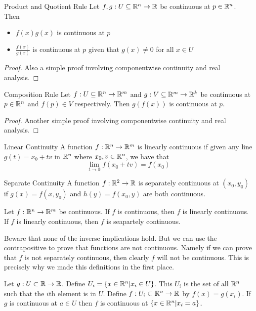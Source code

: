 \documentclass[a4paper]{article}
\begin{document}
\begin{prp}{Product and Quotient Rule}{} Let $f,g:U\subseteq\mathbb{R}^n\to\mathbb{R}$ be continuous at $p\in\mathbb{R}^n$. Then 
\begin{itemize}
\item $f(x)g(x)$ is continuous at $p$
\item $\frac{f(x)}{g(x)}$ is continuous at $p$ given that $g(x)\neq 0$ for all $x\in U$
\end{itemize} 
\begin{proof}
Also a simple proof involving componentwise continuity and real analysis. 
\end{proof}
\end{prp}

\begin{prp}{Composition Rule}{} Let $f:U\subseteq\mathbb{R}^n\to\mathbb{R}^m$ and $g:V\subseteq\mathbb{R}^m\to\mathbb{R}^k$ be continuous at $p\in\mathbb{R}^n$ and $f(p)\in V$ respectively. Then $g(f(x))$ is continuous at $p$. 
\begin{proof}
Another simple proof involving componentwise continuity and real analysis. 
\end{proof}
\end{prp}

\begin{defn}{Linear Continuity}{} A function $f:\mathbb{R}^n\to\mathbb{R}^m$ is linearly continuous if given any line $g(t)=x_0+tv$ in $\mathbb{R}^n$ where $x_0,v\in\mathbb{R}^n$, we have that $$\lim_{t\to 0}f(x_0+tv)=f(x_0)$$
\end{defn}

\begin{defn}{Separate Continuity}{} A function $f:\mathbb{R}^2\to\mathbb{R}$ is separately continuous at $(x_0,y_0)$ if $g(x)=f(x,y_0)$ and $h(y)=f(x_0,y)$ are both continuous. 
\end{defn}

\begin{prp}{}{} Let $f:\mathbb{R}^n\to\mathbb{R}^m$ be continuous. If $f$ is continuous, then $f$ is linearly continuous. If $f$ is linearly continuous, then $f$ is seapartely continuous. 
\end{prp}

Beware that none of the inverse implications hold. But we can use the contrapositive to prove that functions are not continuous. Namely if we can prove that $f$ is not separately continuous, then clearly $f$ will not be continuous. This is precisely why we made this definitions in the first place. 

\begin{prp}{}{} Let $g:U\subset\mathbb{R}\to\mathbb{R}$. Define $U_i=\{x\in\mathbb{R}^n|x_i\in U\}$. This $U_i$ is the set of all $\mathbb{R}^n$ such that the $i$th element is in $U$. Define $f:U_i\subset\mathbb{R}^n\to\mathbb{R}$ by $f(x)=g(x_i)$. If $g$ is continuous at $a\in U$ then $f$ is continuous at $\{x\in\mathbb{R}^n|x_i=a\}$. 
\end{prp}
\end{document}
